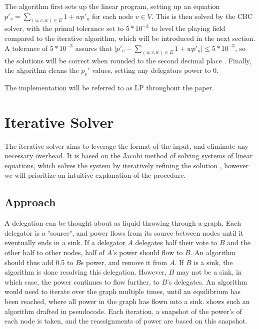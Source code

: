 The algorithm first sets up the linear program, setting up an equation $p'_v = \sum_{(u, v, w) \in E} 1 + wp'_u$ for each node $v \in V$. This is then solved by the CBC solver, with the primal tolerance set to $5*10^{-3}$ to level the playing field compared to the iterative algorithm, which will be introduced in the next section. A tolerance of $5 * 10^{-3}$ assures that $\lvert p'_v -\sum_{(u, v, w) \in E} 1 + wp'_u \rvert \le 5*10^{-3}$, so the solutions will be correct when rounded to the second decimal place \cite{forrestCBCUserGuide2005}. Finally, the algorithm cleans the $p_v'$ values, setting any delegators power to 0. 

The implementation will be referred to as \ac{LP} throughout the paper.


\section{Iterative Solver}

The iterative solver aims to leverage the format of the input, and eliminate any necessary overhead. It is based on the Jacobi method of solving systems of linear equations, which solves the system by iteratively refining the solution \cite{burden2011numerical}, however we will prioritize an intuitive explanation of the procedure.

\subsection{Approach}

A delegation can be thought about as liquid throwing through a graph. Each delegator is a "source", and power flows from its source between nodes until it eventually ends in a sink. If a delegator $A$ delegates half their vote to $B$ and the other half to other nodes, half of $A$'s power should flow to $B$. An algorithm should thus add 0.5 to $B$s power, and remove it from $A$. If $B$ is a sink, the algorithm is done resolving this delegation. However, $B$ may not be a sink, in which case, the power continues to flow further, to $B$'s delegates. An algorithm would need to iterate over the graph multiple times, until an equilibrium has been reached, where all power in the graph has flown into a sink.  shows such an algorithm drafted in pseudocode. Each iteration, a snapshot of the power's of each node is taken, and the reassignments of power are based on this snapshot\footnotemark.  

